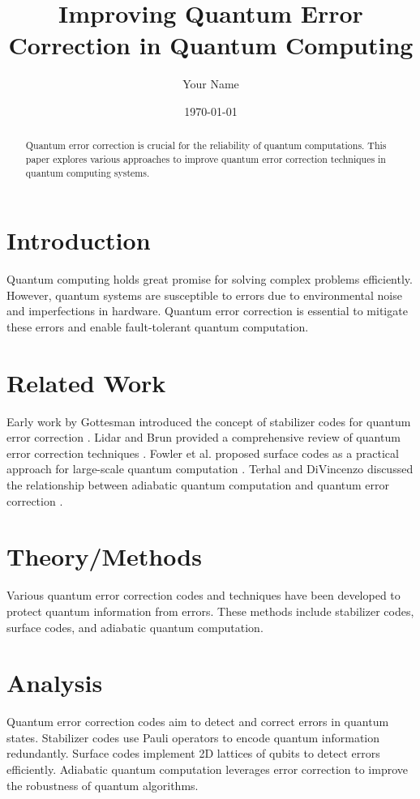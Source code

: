 \documentclass{article}
\title{Improving Quantum Error Correction in Quantum Computing}
\author{Your Name}
\date{\today}
\begin{document}
\maketitle

\begin{abstract}
Quantum error correction is crucial for the reliability of quantum computations. This paper explores various approaches to improve quantum error correction techniques in quantum computing systems.
\end{abstract}

\section{Introduction}
Quantum computing holds great promise for solving complex problems efficiently. However, quantum systems are susceptible to errors due to environmental noise and imperfections in hardware. Quantum error correction is essential to mitigate these errors and enable fault-tolerant quantum computation.

\section{Related Work}
Early work by Gottesman introduced the concept of stabilizer codes for quantum error correction \cite{gottesman1997stabilizer}. Lidar and Brun provided a comprehensive review of quantum error correction techniques \cite{lidar2013quantum}. Fowler et al. proposed surface codes as a practical approach for large-scale quantum computation \cite{fowler2012surface}. Terhal and DiVincenzo discussed the relationship between adiabatic quantum computation and quantum error correction \cite{terhal2015quantum}.

\section{Theory/Methods}
Various quantum error correction codes and techniques have been developed to protect quantum information from errors. These methods include stabilizer codes, surface codes, and adiabatic quantum computation.

\section{Analysis}
Quantum error correction codes aim to detect and correct errors in quantum states. Stabilizer codes use Pauli operators to encode quantum information redundantly. Surface codes implement 2D lattices of qubits to detect errors efficiently. Adiabatic quantum computation leverages error correction to improve the robustness of quantum algorithms.
\end{document}
